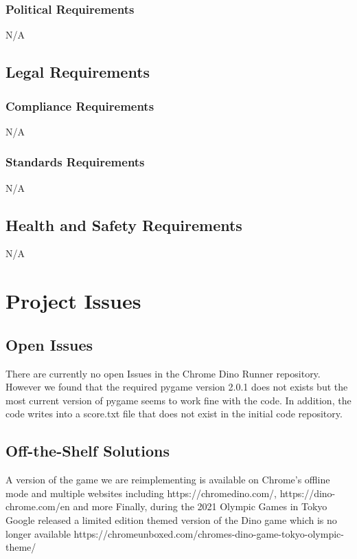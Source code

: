 \documentclass[12pt]{article}
\begin{document}
    \subsubsection{Political Requirements}    N/A
    
\subsection{Legal Requirements}
    \subsubsection{Compliance Requirements}
    N/A
    
    \subsubsection{Standards Requirements} 
    N/A
    
\subsection{Health and Safety Requirements}
    N/A
    
    
\section{Project Issues}
\subsection{Open Issues}
There are currently no open Issues in the Chrome Dino Runner repository.
However we found that the required pygame version 2.0.1 does not exists but the most current version 
of pygame seems to work fine with the code.
In addition, the code writes into a score.txt file that does not exist in the initial code repository.
\subsection{Off-the-Shelf Solutions}
A version of the game we are reimplementing is available on Chrome's offline mode and multiple websites including
https://chromedino.com/, https://dino-chrome.com/en and more
Finally, during the 2021 Olympic Games in Tokyo Google released a limited edition themed version of the Dino game which is no longer available https://chromeunboxed.com/chromes-dino-game-tokyo-olympic-theme/
\end{document}
